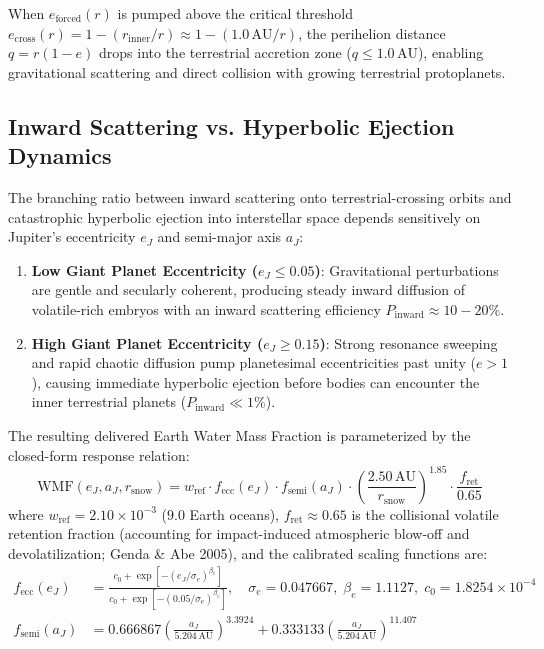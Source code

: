 \documentclass[11pt,a4paper]{article}
\begin{document}
When $e_{\text{forced}}(r)$ is pumped above the critical threshold $e_{\text{cross}}(r) = 1 - (r_{\text{inner}} / r) \approx 1 - (1.0\,\text{AU} / r)$, the perihelion distance $q = r(1-e)$ drops into the terrestrial accretion zone ($q \le 1.0\,\text{AU}$), enabling gravitational scattering and direct collision with growing terrestrial protoplanets.

\subsection{Inward Scattering vs. Hyperbolic Ejection Dynamics}
The branching ratio between inward scattering onto terrestrial-crossing orbits and catastrophic hyperbolic ejection into interstellar space depends sensitively on Jupiter's eccentricity $e_J$ and semi-major axis $a_J$:
\begin{enumerate}
    \item \textbf{Low Giant Planet Eccentricity ($e_J \le 0.05$)}: Gravitational perturbations are gentle and secularly coherent, producing steady inward diffusion of volatile-rich embryos with an inward scattering efficiency $P_{\text{inward}} \approx 10 - 20\%$.
    \item \textbf{High Giant Planet Eccentricity ($e_J \ge 0.15$)}: Strong resonance sweeping and rapid chaotic diffusion pump planetesimal eccentricities past unity ($e > 1$), causing immediate hyperbolic ejection before bodies can encounter the inner terrestrial planets ($P_{\text{inward}} \ll 1\%$).
\end{enumerate}

The resulting delivered Earth Water Mass Fraction is parameterized by the closed-form response relation:
\begin{equation}
\text{WMF}(e_J, a_J, r_{\text{snow}}) = w_{\text{ref}} \cdot f_{\text{ecc}}(e_J) \cdot f_{\text{semi}}(a_J) \cdot \left(\frac{2.50\,\text{AU}}{r_{\text{snow}}}\right)^{1.85} \cdot \frac{f_{\text{ret}}}{0.65}
\label{eq:wmf_master}
\end{equation}
where $w_{\text{ref}} = 2.10 \times 10^{-3}$ ($9.0$ Earth oceans), $f_{\text{ret}} \approx 0.65$ is the collisional volatile retention fraction (accounting for impact-induced atmospheric blow-off and devolatilization; Genda \& Abe 2005), and the calibrated scaling functions are:
\begin{align}
f_{\text{ecc}}(e_J) &= \frac{c_0 + \exp\left[-(e_J / \sigma_e)^{\beta_e}\right]}{c_0 + \exp\left[-(0.05 / \sigma_e)^{\beta_e}\right]}, \quad \sigma_e = 0.047667, \;\beta_e = 1.1127, \;c_0 = 1.8254 \times 10^{-4} \label{eq:f_ecc} \\
f_{\text{semi}}(a_J) &= 0.666867 \left(\frac{a_J}{5.204\,\text{AU}}\right)^{3.3924} + 0.333133 \left(\frac{a_J}{5.204\,\text{AU}}\right)^{11.407} \label{eq:f_semi}
\end{align}
\end{document}
